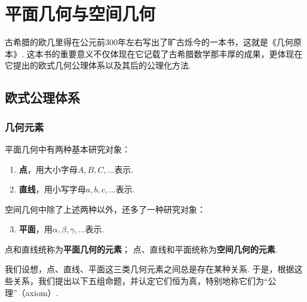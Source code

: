 \chapter{平面几何与空间几何}
古希腊的欧几里得在公元前300年左右写出了旷古烁今的一本书，这就是《几何原本》.
这本书的重要意义不仅体现在它记载了古希腊数学那丰厚的成果，更体现在它提出的欧式几何公理体系以及其后的公理化方法.

\section{欧式公理体系}
\subsection{几何元素}
\begin{definition}
平面几何中有两种基本研究对象：\begin{enumerate}
\item \textbf{点}，用大小字母\(A,B,C,\dotsc\)表示.
\item \textbf{直线}，用小写字母\(a,b,c,\dotsc\)表示.
\end{enumerate}
空间几何中除了上述两种以外，还多了一种研究对象：\begin{enumerate}
\setcounter{enumi}{2}
\item \textbf{平面}，用\(\alpha,\beta,\gamma,\dotsc\)表示.
\end{enumerate}
点和直线统称为\textbf{平面几何的元素}；
点、直线和平面统称为\textbf{空间几何的元素}.
\end{definition}

我们设想，点、直线、平面这三类几何元素之间总是存在某种关系.
于是，根据这些关系，我们提出以下五组命题，并认定它们恒为真，特别地称它们为“公理”（axiom）.

